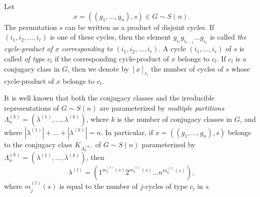 \documentclass[12pt]{amsart}
\theoremstyle{definition}
\numberwithin{equation}{section}
\begin{document}
Let
$$
x=\left(\left(g_1,\ldots,g_n\right),s\right)\in G\sim S(n).
$$
The permutation $s$ can be written as a product of disjoint cycles. If
$(i_1,i_2,\ldots,i_r)$ is one of these cycles, then the element
$g_{i_{r}}g_{i_{r-1}}\ldots g_{i_1}$ is called \textit{the cycle-product of $x$
corresponding to $(i_1,i_2,\ldots,i_r)$}.
A cycle $(i_1,\ldots,i_r)$  of $s$ is called \textit{of type $c_l$}
if the corresponding cycle-product of $x$  belongs to $c_l$.
If $c_l$ is a conjugacy class in $G$, then
we denote by $[x]_{c_l}$
the number of cycles of $s$ whose cycle-product of $x$ belongs to $c_l$.













It is well known that both the conjugacy classes and the irreducible representations of $G\sim S(n)$ are parameterized by \textit{multiple partitions} $\Lambda_n^{(k)}=\left(\lambda^{(1)},\ldots,\lambda^{(k)}\right)$,
where $k$ is the number of conjugacy classes in $G$, and where $|\lambda^{(1)}|+\ldots+|\lambda^{(k)}|=n$. In particular, if
$x=\left(\left(g_1,\ldots,g_n\right),s\right)$ belongs to the conjugacy class
$K_{\Lambda_n^{(k)}}$  of $G\sim S(n)$  parameterized by $\Lambda_n^{(k)}=\left(\lambda^{(1)},\ldots,\lambda^{(k)}\right)$, then
$$
\lambda^{(l)}=\left(1^{m_1^{(l)}(s)}2^{m_2^{(l)}(s)}\ldots n^{m_n^{(l)}(s)}\right),
$$
where $m_j^{(l)}(s)$ is equal to the number of $j$-cycles of type $c_l$ in $s$.
\end{document}

